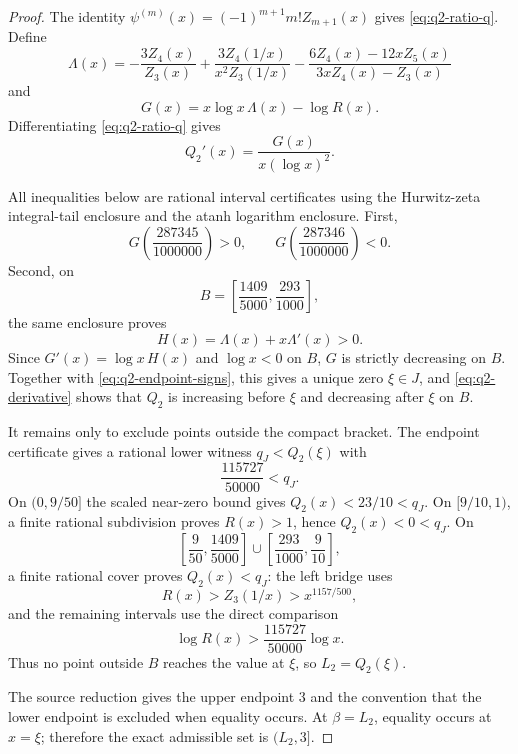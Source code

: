 \documentclass[11pt]{article}
\numberwithin{equation}{section}
\theoremstyle{definition}
\theoremstyle{remark}
\newcommand{\1}{\mathbf 1}
\begin{document}
\begin{proof}
The identity \(\psi^{(m)}(x)=(-1)^{m+1}m!Z_{m+1}(x)\) gives \eqref{eq:q2-ratio-q}.  Define
\begin{equation}
\label{eq:q2-lambda}
\Lambda(x)=
-\frac{3Z_4(x)}{Z_3(x)}
+\frac{3Z_4(1/x)}{x^2Z_3(1/x)}
-\frac{6Z_4(x)-12xZ_5(x)}{3xZ_4(x)-Z_3(x)}
\end{equation}
and
\begin{equation}
\label{eq:q2-g-function}
G(x)=x\log x\,\Lambda(x)-\log R(x).
\end{equation}
Differentiating \eqref{eq:q2-ratio-q} gives
\begin{equation}
\label{eq:q2-derivative}
Q_2'(x)=\frac{G(x)}{x(\log x)^2}.
\end{equation}

All inequalities below are rational interval certificates using the Hurwitz-zeta integral-tail enclosure and the atanh logarithm enclosure.  First,
\begin{equation}
\label{eq:q2-endpoint-signs}
G\!\left(\frac{287345}{1000000}\right)>0,
\qquad
G\!\left(\frac{287346}{1000000}\right)<0.
\end{equation}
Second, on
\[
B=\left[\frac{1409}{5000},\frac{293}{1000}\right],
\]
the same enclosure proves
\begin{equation}
\label{eq:q2-h-positive}
H(x)=\Lambda(x)+x\Lambda'(x)>0.
\end{equation}
Since \(G'(x)=\log x\,H(x)\) and \(\log x<0\) on \(B\), \(G\) is strictly decreasing on \(B\).  Together with \eqref{eq:q2-endpoint-signs}, this gives a unique zero \(\xi\in J\), and \eqref{eq:q2-derivative} shows that \(Q_2\) is increasing before \(\xi\) and decreasing after \(\xi\) on \(B\).

It remains only to exclude points outside the compact bracket.  The endpoint certificate gives a rational lower witness \(q_J<Q_2(\xi)\) with
\begin{equation}
\label{eq:q2-qJ-lower}
\frac{115727}{50000}<q_J.
\end{equation}
On \((0,9/50]\) the scaled near-zero bound gives \(Q_2(x)<23/10<q_J\).  On \([9/10,1)\), a finite rational subdivision proves \(R(x)>1\), hence \(Q_2(x)<0<q_J\).  On
\[
\left[\frac9{50},\frac{1409}{5000}\right]
\cup
\left[\frac{293}{1000},\frac9{10}\right],
\]
a finite rational cover proves \(Q_2(x)<q_J\): the left bridge uses
\[
R(x)>Z_3(1/x)>x^{1157/500},
\]
and the remaining intervals use the direct comparison
\[
\log R(x)>\frac{115727}{50000}\log x.
\]
Thus no point outside \(B\) reaches the value at \(\xi\), so \(L_2=Q_2(\xi)\).

The source reduction gives the upper endpoint \(3\) and the convention that the lower endpoint is excluded when equality occurs.  At \(\beta=L_2\), equality occurs at \(x=\xi\); therefore the exact admissible set is \((L_2,3]\).
\end{proof}
\end{document}
